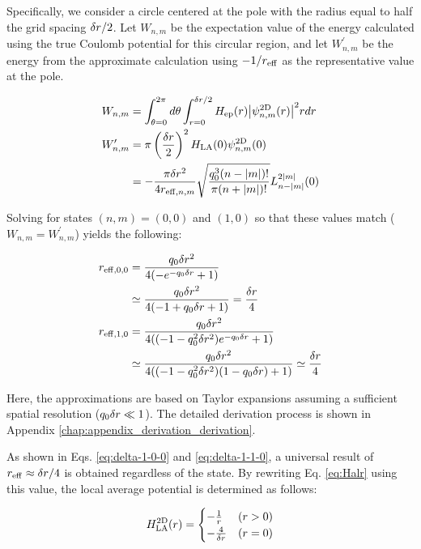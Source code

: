 \documentclass[aip-draft.tex]{subfiles}
\begin{document}
Specifically, we consider a circle centered at the pole with the radius equal to
half the grid spacing $\delta r/2$. Let $W_{n,m}$ be the expectation value of the
energy calculated using the true Coulomb potential for this circular region, and
let $W_{n,m}^\prime$ be the energy from the approximate calculation using
$-1/r_{\mathrm{eff}}$ as the representative value at the pole.

\begin{align}
    W_{n,m}&=\int_{\theta=0}^{2\pi}d\theta\int_{r=0}^{\delta r/2}
    H_{\mathrm{ep}}(r){\left| \psi^{\mathrm{2D}}_{n,m}(r) \right|}^2r dr\\
    W_{n,m}^\prime&=\pi\left(\frac{\delta r}{2}\right)^2
    H_{\mathrm{LA}}(0)\psi^{\mathrm{2D}}_{n,m}(0) \notag \\
    &=-\frac{\pi\delta r^2}{4r_{\mathrm{eff},n,m}}
    \sqrt{\frac{q_0^3(n-{\left| m \right|})!}{\pi(n+{\left| m \right|})!}}
    L_{n-{\left| m \right|}}^{2{\left| m \right|}}(0)
\end{align}

Solving for states $(n,m)=(0,0)$ and $(1,0)$ so that these values match
($W_{n,m}=W_{n,m}^\prime$) yields the following:

\begin{align}
    r_{\mathrm{eff},0,0} &=\frac{q_0\delta r^2}{4(-e^{-q_0\delta r}+1)}\\
    &\simeq \frac{q_0\delta r^2}{4(-1+q_0\delta r+1)}=\frac{\delta r}{4}
    \label{eq:delta-1-0-0}\\
    r_{\mathrm{eff},1,0} &=\frac{q_0\delta r^2}{4((-1-q_0^2\delta r^2)e^{-q_0\delta r}+1)}\\
    &\simeq \frac{q_0\delta r^2}{4((-1-q_0^2\delta r^2)(1-q_0\delta r)+1)}
    \simeq\frac{\delta r}{4}
    \label{eq:delta-1-1-0}
\end{align}

Here, the approximations are based on Taylor expansions assuming a sufficient
spatial resolution ($q_0\delta r \ll 1$). The detailed derivation process is shown
in Appendix \ref{chap:appendix_derivation_derivation}.

As shown in Eqs. \eqref{eq:delta-1-0-0} and \eqref{eq:delta-1-1-0}, a universal
result of $r_{\mathrm{eff}} \approx \delta r/4$ is obtained regardless of the state. By
rewriting Eq. \eqref{eq:Halr} using this value, the local average potential is
determined as follows:

\begin{equation}
H_{\mathrm{LA}}^{\mathrm{2D}}(r) = \begin{cases}
-\frac{1}{r} & (r>0) \\
-\frac{4}{\delta r} & (r=0)
\end{cases}
\label{eq:Hlar2d-fixed}
\end{equation}
\end{document}
